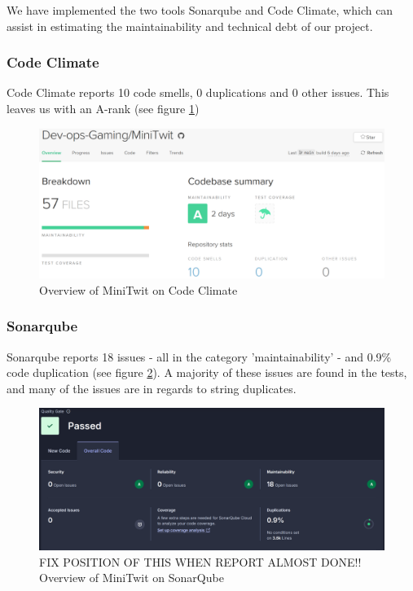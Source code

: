 We have implemented the two tools Sonarqube and Code Climate, which can assist in estimating the maintainability and technical debt of our project.
\subsubsection{Code Climate}
Code Climate reports 10 code smells, 0 duplications and 0 other issues. This leaves us with an A-rank (see figure \ref{fig:CodeClimate})\\
\begin{figure}[h]
\centering
\includegraphics[width=\textwidth]{images/code_climate.png}
\caption{Overview of MiniTwit on Code Climate}
\label{fig:CodeClimate}
\end{figure}

\subsubsection{Sonarqube}
Sonarqube reports 18 issues - all in the category 'maintainability' - and 0.9\% code duplication (see figure \ref{fig:SonarQube}). A majority of these issues are found in the tests, and many of the issues are in regards to string duplicates.
\begin{figure}[h]
\centering
\includegraphics[width=\textwidth]{images/sonarQube.png}
\caption{FIX POSITION OF THIS WHEN REPORT ALMOST DONE!! Overview of MiniTwit on SonarQube}
\label{fig:SonarQube}
\end{figure}